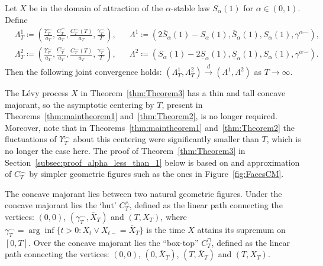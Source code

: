 \documentclass[AHL,Unicode,longabstracts,published]{cedram}
\newcommand\1{\mathds{1}}
\newcommand\cid{\xrightarrow{d}}
\newcommand\ov[1]{\overline{#1}}
\newcommand\un[1]{\underline{#1}}
\begin{document}
\begin{theo}\label{thm:Theorem3}
Let $X$ be in the domain of attraction of the $\alpha$-stable law $S_\alpha(1)$ for $\alpha\in(0,1)$. Define
\begin{align*}
&\Lambda_T^1
\coloneqq \left(\frac{\Upsilon_T^{\frown}}{a_T},
\frac{\ov{C}_T^\frown}{a_T},
\frac{C_T^\frown(T)}{a_T},
\frac{\gamma_T^\frown}{T}\right), &&\Lambda^1
\coloneqq \left(2\ov{S}_\alpha(1)-S_\alpha(1),
\ov{S}_\alpha(1), S_\alpha(1),
\gamma^{\alpha\frown}\right),\\
&\Lambda_T^2
\coloneqq \left(\frac{\Upsilon_T^{\smile}}{a_T},
\frac{\underbar{C}_T^\smile}{a_T},
\frac{C_T^\smile(T)}{a_T},
\frac{\gamma_T^\smile}{T}\right), &&\Lambda^2
\coloneqq \left(S_\alpha(1)-2\un{S}_\alpha(1),
\un{S}_\alpha(1), S_\alpha(1),
\gamma^{\alpha\smile} \right).
\end{align*}
Then the following joint convergence holds: $(\Lambda_T^1,\Lambda_T^2)\cid (\Lambda^1,\Lambda^2)$ as $T\to\infty$.
\end{theo}

The Lévy process $X$ in Theorem~\ref{thm:Theorem3} has a thin and tall concave majorant, so the asymptotic centering by $T$, present in Theorems~\ref{thm:maintheorem1} and~\ref{thm:Theorem2}, is no longer required. Moreover, note that in Theorems~\ref{thm:maintheorem1} and~\ref{thm:Theorem2} the fluctuations of $\Upsilon_T^\frown$ about this centering were significantly smaller than $T$, which is no longer the case here. The proof of Theorem~\ref{thm:Theorem3} in Section~\ref{subsec:proof_alpha_less_than_1} below is based on and approximation of $C_T^\frown$ by simpler geometric figures such as the ones in Figure~\ref{fig:FacesCM}.

The concave majorant lies between two natural geometric figures. Under the concave majorant lies the `hut' $C^\wedge_T$, defined as the linear path connecting the vertices: $(0,0)$, $(\gamma_T^\frown,\ov{X}_T)$ and $(T,X_T)$, where $\gamma_T^\frown=\arg\inf\{t>0:X_t\vee X_{t-}=\ov{X}_T\}$ is the time $X$ attains its supremum on $[0,T]$. Over the concave majorant lies the ``box-top'' $C^\sqcap_T$, defined as the linear path connecting the vertices: $(0,0)$, $(0,\ov{X}_T)$, $(T,\ov{X}_T)$ and $(T,X_T)$.
\end{document}
